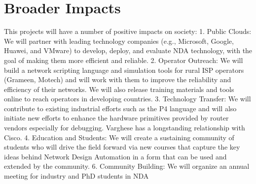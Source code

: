 \section{Broader Impacts}

This projects will have a number of positive impacts on society: 1. Public Clouds: We will partner with leading technology companies (e.g., Microsoft, Google, Huawei, and VMware) to develop, deploy, and evaluate NDA technology, with the goal of making them more efficient and reliable. 2. Operator Outreach: We will build a network scripting language and simulation tools for rural ISP operators (Grameen, Motech) and will work with them to improve the reliability and efficiency of their networks. We will also release training materials and tools online to reach operators in developing countries. 3. Technology Transfer: We will contribute to existing industrial efforts such as the P4 language and will also initiate new efforts to enhance the hardware primitives provided by router vendors especially for debugging. Varghese has a longstanding relationship with Cisco. 4. Education and Students: We will create a sustaining community of students who will drive the field forward via new courses that capture the key ideas behind Network Design Automation in a form that can be used and extended by the community. 6. Community Building: We will organize an annual meeting for industry and PhD students in NDA